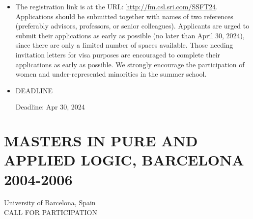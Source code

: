 \documentclass[prodmode,acmtecs]{acmsmall} %
\begin{document}
\begin{itemize}
\item  The registration link is at the URL: \href{http://fm.csl.sri.com/SSFT24}{http://fm.csl.sri.com/SSFT24}. Applications should be submitted together with names of two references (preferably advisors, professors, or senior colleagues). Applicants are urged to submit their applications as early as possible (no later than April 30, 2024), since there are only a limited number of spaces available. Those needing invitation letters for visa purposes are encouraged to complete their applications as early as possible. We strongly encourage the participation of women and under-represented minorities in the summer school. 
 
\item  DEADLINE 
 
Deadline: Apr 30, 2024 
 
\end{itemize}\section{MASTERS IN PURE AND APPLIED LOGIC, BARCELONA 2004-2006}\label{MASTERSINPUREANDAPPLIEDLOGICBARCELONA20042006}  University of Barcelona, Spain\\ 
CALL FOR PARTICIPATION 
\end{document}
